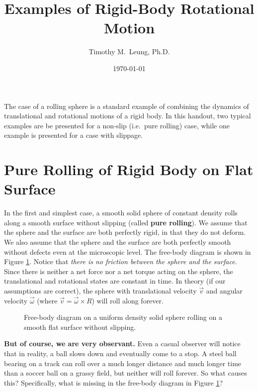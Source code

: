 \documentclass{../../oss-handout}
\title{Examples of Rigid-Body Rotational Motion}
\author{Timothy M.\ Leung, Ph.D.}
\date{\today}
\begin{document}
\thispagestyle{title}
\gentitle

The case of a rolling sphere is a standard example of combining the dynamics of
translational and rotational motions of a rigid body. In this handout, two
typical examples are be presented for a non-slip (i.e.\ pure rolling) case,
while one example is presented for a case with slippage.

\section{Pure Rolling of Rigid Body on Flat Surface}
\label{no-slip-ball}
In the first and simplest case, a smooth solid sphere of constant density rolls
along a smooth surface without slipping (called \textbf{pure rolling}). We
assume that the sphere and the surface are both perfectly rigid, in that they
do not deform. We also assume that the sphere and the surface are both
perfectly smooth without defects even at the microscopic level. The free-body
diagram is shown in Figure \ref{roll-flat}. Notice that
\emph{there is no friction between the sphere and the surface}. Since there is
neither a net force nor a net torque acting on the sphere, the translational
and rotational states are constant in time. In theory (if our assumptions are
correct), the sphere with translational velocity $\vec v$ and angular
velocity $\vec\omega$ (where $\vec v=\vec\omega\times R$) will roll along
forever.
\begin{figure}[!ht]
  \centering
  \caption{Free-body diagram on a uniform density solid sphere rolling on a
    smooth flat surface without slipping.}
  \label{roll-flat}
\end{figure}

\textbf{But of course, we are very observant.} Even a casual observer will
notice that in reality, a ball slows down and eventually come to a stop. A
steel ball bearing on a track can roll over a much longer distance and
much longer time than a soccer ball on a grassy field, but neither will roll
forever. So what causes this? Specifically, what is missing in the free-body
diagram in Figure \ref{roll-flat}?
\newpage
\end{document}
